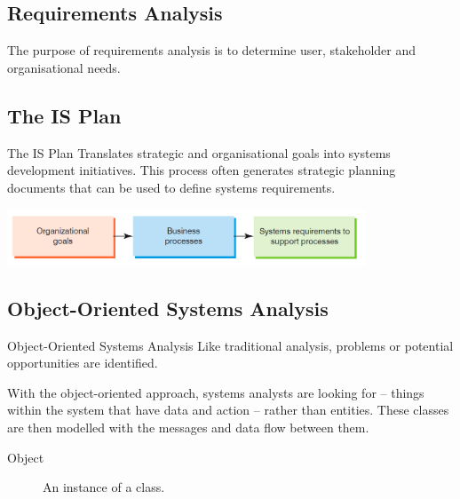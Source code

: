 \documentclass[\main/notes.tex]{subfiles}
\begin{document}
			\subsection{Requirements Analysis}
					The purpose of requirements analysis is to determine user, stakeholder and organisational needs.
			\subsection{The IS Plan}
				\begin{definition}{The IS Plan}
					Translates strategic and organisational goals into systems development initiatives. This process often generates strategic planning documents that can be used to define systems requirements.
					\begin{center}
						\includegraphics[width=0.8\textwidth]{chapter11/is_plan.png}
					\end{center}
				\end{definition}
			\subsection{Object-Oriented Systems Analysis}
				\begin{definition}{Object-Oriented Systems Analysis}
					Like traditional analysis, problems or potential opportunities are identified.

					With the object-oriented approach, systems analysts are looking for  -- things within the system that have data and action -- rather than entities. These classes are then modelled with the messages and data flow between them.

					\begin{description}
						\item[Object] An instance of a class.
					\end{description}
				\end{definition}
\end{document}
